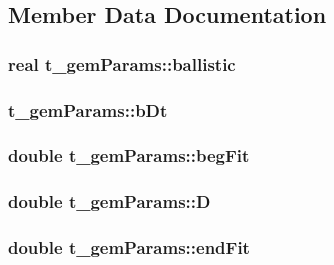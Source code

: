 \subsection{\-Member \-Data \-Documentation}
\hypertarget{structt__gemParams_a3fb2266216dce29cd60ca3d78be8b269}{
\subsubsection[{ballistic}]{\setlength{\rightskip}{0pt plus 5cm}real {\bf t\-\_\-gem\-Params\-::ballistic}}}\label{structt__gemParams_a3fb2266216dce29cd60ca3d78be8b269}
\hypertarget{structt__gemParams_a4d26199e583777437f480feb409f0cbd}{
\subsubsection[{b\-Dt}]{ {\bf t\-\_\-gem\-Params\-::b\-Dt}}}\label{structt__gemParams_a4d26199e583777437f480feb409f0cbd}
\hypertarget{structt__gemParams_a044f189700009bc0341fe51267d8adda}{
\subsubsection[{beg\-Fit}]{\setlength{\rightskip}{0pt plus 5cm}double {\bf t\-\_\-gem\-Params\-::beg\-Fit}}}\label{structt__gemParams_a044f189700009bc0341fe51267d8adda}
\hypertarget{structt__gemParams_a1bc80555383c9b8cfd57159e048068d1}{
\subsubsection[{\-D}]{\setlength{\rightskip}{0pt plus 5cm}double {\bf t\-\_\-gem\-Params\-::\-D}}}\label{structt__gemParams_a1bc80555383c9b8cfd57159e048068d1}
\hypertarget{structt__gemParams_ad10df59463d1747d1d5e1dc69f9bd3b0}{
\subsubsection[{end\-Fit}]{\setlength{\rightskip}{0pt plus 5cm}double {\bf t\-\_\-gem\-Params\-::end\-Fit}}}\label{structt__gemParams_ad10df59463d1747d1d5e1dc69f9bd3b0}
